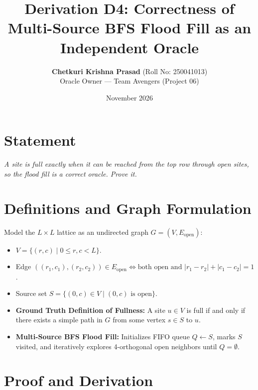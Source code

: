 \documentclass[11pt,a4paper]{article}
\title{\textbf{Derivation D4: Correctness of Multi-Source BFS Flood Fill as an Independent Oracle}}
\author{\textbf{Chetkuri Krishna Prasad} (Roll No: 250041013) \\ Oracle Owner --- Team Avengers (Project 06)}
\date{November 2026}
\begin{document}
\maketitle

\section{Statement}
\textit{A site is full exactly when it can be reached from the top row through open sites, so the flood fill is a correct oracle. Prove it.}

\section{Definitions and Graph Formulation}
Model the $L \times L$ lattice as an undirected graph $G = (V, E_{\text{open}})$:
\begin{itemize}
    \item $V = \{(r, c) \mid 0 \le r, c < L\}$.
    \item Edge $((r_1, c_1), (r_2, c_2)) \in E_{\text{open}} \iff \text{both open and } |r_1 - r_2| + |c_1 - c_2| = 1$.
    \item Source set $S = \{(0, c) \in V \mid (0, c) \text{ is open}\}$.
    \item \textbf{Ground Truth Definition of Fullness:} A site $u \in V$ is full if and only if there exists a simple path in $G$ from some vertex $s \in S$ to $u$.
    \item \textbf{Multi-Source BFS Flood Fill:} Initializes FIFO queue $Q \leftarrow S$, marks $S$ visited, and iteratively explores 4-orthogonal open neighbors until $Q = \emptyset$.
\end{itemize}

\section{Proof and Derivation}
\end{document}
